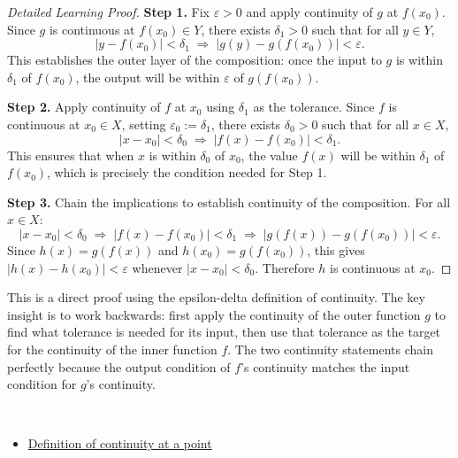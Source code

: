 \begin{proof}[Detailed Learning Proof]
\LRAProofBodyStart

\textbf{Step 1.} Fix $\varepsilon > 0$ and apply continuity of $g$ at $f(x_0)$. Since $g$ is continuous at $f(x_0) \in Y$, there exists $\delta_1 > 0$ such that for all $y \in Y$,
\[
  |y - f(x_0)| < \delta_1 \;\Rightarrow\; |g(y) - g(f(x_0))| < \varepsilon.
\]
This establishes the outer layer of the composition: once the input to $g$ is within $\delta_1$ of $f(x_0)$, the output will be within $\varepsilon$ of $g(f(x_0))$.

\textbf{Step 2.} Apply continuity of $f$ at $x_0$ using $\delta_1$ as the tolerance. Since $f$ is continuous at $x_0 \in X$, setting $\varepsilon_0 := \delta_1$, there exists $\delta_0 > 0$ such that for all $x \in X$,
\[
  |x - x_0| < \delta_0 \;\Rightarrow\; |f(x) - f(x_0)| < \delta_1.
\]
This ensures that when $x$ is within $\delta_0$ of $x_0$, the value $f(x)$ will be within $\delta_1$ of $f(x_0)$, which is precisely the condition needed for Step 1.

\textbf{Step 3.} Chain the implications to establish continuity of the composition. For all $x \in X$:
\[
  |x - x_0| < \delta_0
  \;\Rightarrow\; |f(x) - f(x_0)| < \delta_1
  \;\Rightarrow\; |g(f(x)) - g(f(x_0))| < \varepsilon.
\]
Since $h(x) = g(f(x))$ and $h(x_0) = g(f(x_0))$, this gives $|h(x) - h(x_0)| < \varepsilon$ whenever $|x - x_0| < \delta_0$. Therefore $h$ is continuous at $x_0$.
\end{proof}

\begin{remark*}
This is a direct proof using the epsilon-delta definition of continuity. The key insight is to work backwards: first apply the continuity of the outer function $g$ to find what tolerance is needed for its input, then use that tolerance as the target for the continuity of the inner function $f$. The two continuity statements chain perfectly because the output condition of $f$'s continuity matches the input condition for $g$'s continuity.
\end{remark*}

\begin{remark*}[Dependencies]~\\
\begin{itemize}
  \item \hyperref[def:continuous-at-point]{Definition of continuity at a point}
\end{itemize}
\end{remark*}
